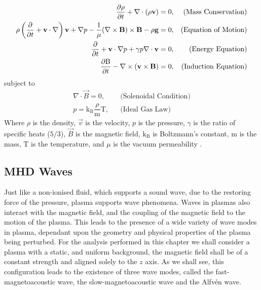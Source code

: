 \begin{align}                                                  
    \dfrac{\partial \rho }{\partial t} + \nabla \cdot (\rho \mathbf{v}) = 0,
    &&\text{(Mass Conservation)}\label{eq:imhd_mass}\\
    \rho  \left(\frac{\partial}{\partial t} + \mathbf{v}\cdot\nabla\right)\mathbf{v} + \nabla p - \dfrac{1}{\mu}(\nabla \times \mathbf{B}) \times \mathbf{B} - \rho \mathbf{g} = 0,
    &&\text{(Equation of Motion)}\label{eq:imhd_motion}\\
    \frac{\partial}{\partial t} + \mathbf{v}\cdot\nabla p + \gamma p \nabla \cdot \mathbf{v}  = 0,
    &&\text{(Energy Equation)}\label{eq:imhd_equation}\\
    \dfrac{\partial \mathrm{B}}{\partial t} - \nabla \times (\mathbf{v} \times \mathbf{B}) = 0,
    &&\text{(Induction Equation)}\label{eq:imhd_induction}
\end{align}
subject to
\begin{align}
    \nabla \cdot \vec{B} = 0,
    &&\text{(Solenoidal Condition)}\\
    p = \mathrm{k_B} \dfrac{\rho}{\mathrm{m}} \mathrm{T},
    &&\text{(Ideal Gas Law)}                    
\end{align}
Where $\rho$ is the density, $\vec{v}$ is the velocity, $p$ is the pressure, $\gamma$ is the ratio of specific heats ($5/3$), $\vec{B}$ is the magnetic field, $\mathrm{k_B}$ is Boltzmann's constant, $\mathrm{m}$ is the mass, $\mathrm{T}$ is the temperature, and $\mu$ is the vacuum permeability \citep{goedbloed2004}.


\subsection{MHD Waves}\label{sec:MHDwaves}
Just like a non-ionised fluid, which supports a sound wave, due to the restoring force of the pressure, plasma supports wave phenomena.
Waves in plasmas also interact with the magnetic field, and the coupling of the magnetic field to the motion of the plasma.
This leads to the presence of a wide variety of wave modes in plasma, dependant upon the geometry and physical properties of the plasma being perturbed.
For the analysis performed in this chapter we shall consider a plasma with a static, and uniform background, the magnetic field shall be of a constant strength and aligned solely to the $z$ axis.
As we shall see, this configuration leads to the existence of three wave modes, called the fast-magnetoacoustic wave, the slow-magnetoacoustic wave and the Alfv\'en wave.

